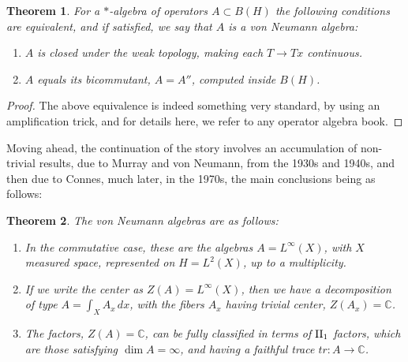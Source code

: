 \documentclass[12pt]{amsbook}
\newtheorem{theorem}{Theorem}[chapter]
\begin{document}
\begin{theorem}
For a $*$-algebra of operators $A\subset B(H)$ the following conditions are equivalent, and if satisfied, we say that $A$ is a von Neumann algebra:
\begin{enumerate}
\item $A$ is closed under the weak topology, making each $T\to Tx$ continuous.

\item $A$ equals its bicommutant, $A=A''$, computed inside $B(H)$.
\end{enumerate}
\end{theorem}

\begin{proof}
The above equivalence is indeed something very standard, by using an amplification trick, and for details here, we refer to any operator algebra book. 
\end{proof}

Moving ahead, the continuation of the story involves an accumulation of non-trivial results, due to Murray and von Neumann, from the 1930s and 1940s, and then due to Connes, much later, in the 1970s, the main conclusions being as follows:

\begin{theorem}
The von Neumann algebras are as follows:
\begin{enumerate}
\item In the commutative case, these are the algebras $A=L^\infty(X)$, with $X$ measured space, represented on $H=L^2(X)$, up to a multiplicity.

\item If we write the center as $Z(A)=L^\infty(X)$, then we have a decomposition of type $A=\int_XA_x\,dx$, with the fibers $A_x$ having trivial center,  $Z(A_x)=\mathbb C$.

\item The factors, $Z(A)=\mathbb C$, can be fully classified in terms of ${\rm II}_1$ factors, which are those satisfying $\dim A=\infty$, and having a faithful trace $tr:A\to\mathbb C$.
\end{enumerate}
\end{theorem}
\end{document}
